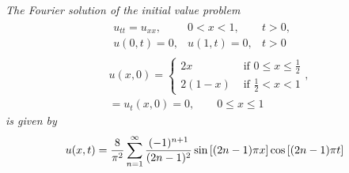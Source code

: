 \emph{The Fourier solution of the initial value problem}
\begin{align*}
    &\begin{array}{lll}
        u_{tt} = u_{xx}, &0 < x < 1, & t > 0, \\
        u(0, t) = 0, & u(1, t) = 0, & t > 0
    \end{array} \\
    &u(x,0) = \begin{cases}
        2x & \text{ if } 0 \leq x \leq \frac{1}{2} \\
        2(1-x) & \text{ if } \frac{1}{2} < x < 1
    \end{cases}, \\
    &= u_t(x,0) = 0, \qquad 0 \leq x \leq 1
\end{align*}
\emph{is given by $$u(x,t) = \frac{8}{\pi^2}\sum_{n=1}^\infty \frac{(-1)^{n+1}}{(2n-1)^2}\sin\qty[(2n-1)\pi x]\cos\qty[(2n-1)\pi t]$$}
